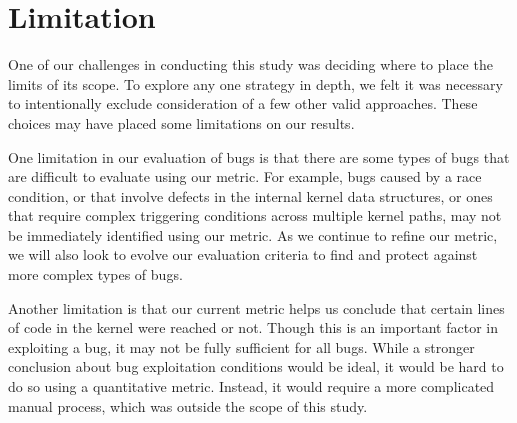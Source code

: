 \section{Limitation} 
\label{sec.limitation}

One of our challenges in conducting this study was deciding where to place the
limits of its scope. To explore any one strategy
in depth, we felt it was necessary to intentionally exclude consideration of
a few other valid approaches. These choices may have placed some limitations on our results.

One limitation in our evaluation of bugs is that there are some types of bugs that are difficult to evaluate using our metric. 
For example, bugs caused by a race condition, or that involve defects in the internal kernel data
structures, or ones that require complex triggering conditions across multiple kernel
paths, may not be immediately identified using our metric. As we continue to refine our metric, 
we will also look to evolve our evaluation criteria to find and protect against more complex types of bugs. 

Another limitation is that our current metric helps us conclude that certain lines of code in the kernel were reached or not.
Though this is an important factor in exploiting a bug, it may not be fully sufficient for all bugs. 
While a stronger conclusion about bug exploitation conditions would be ideal, 
it would be hard to do so using a quantitative metric. 
Instead, it would require a more complicated manual process, which was outside the scope of this study. 
